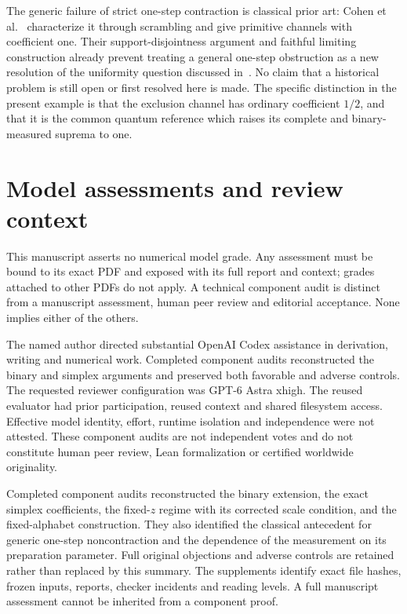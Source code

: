 \documentclass[11pt]{article}
\theoremstyle{remark}\newtheorem{remark}[theorem]{Remark}
\begin{document}
The generic failure of strict one-step contraction is classical prior art: Cohen et al.~\cite[Theorem 4.2 and Remark 4.3]{Cohen} characterize it through scrambling and give primitive channels with coefficient one. Their support-disjointness argument and faithful limiting construction already prevent treating a general one-step obstruction as a new resolution of the uniformity question discussed in~\cite{GR}. No claim that a historical problem is still open or first resolved here is made. The specific distinction in the present example is that the exclusion channel has ordinary coefficient $1/2$, and that it is the common quantum reference which raises its complete and binary-measured suprema to one.

\clearpage
\appendix
\section{Model assessments and review context}
This manuscript asserts no numerical model grade. Any assessment must be bound to its exact PDF and exposed with its full report and context; grades attached to other PDFs do not apply. A technical component audit is distinct from a manuscript assessment, human peer review and editorial acceptance. None implies either of the others.

The named author directed substantial OpenAI Codex assistance in derivation, writing and numerical work. Completed component audits reconstructed the binary and simplex arguments and preserved both favorable and adverse controls. The requested reviewer configuration was GPT-6 Astra xhigh. The reused evaluator had prior participation, reused context and shared filesystem access. Effective model identity, effort, runtime isolation and independence were not attested. These component audits are not independent votes and do not constitute human peer review, Lean formalization or certified worldwide originality.

Completed component audits reconstructed the binary extension, the exact simplex coefficients, the fixed-$z$ regime with its corrected scale condition, and the fixed-alphabet construction. They also identified the classical antecedent for generic one-step noncontraction and the dependence of the measurement on its preparation parameter. Full original objections and adverse controls are retained rather than replaced by this summary. The supplements identify exact file hashes, frozen inputs, reports, checker incidents and reading levels. A full manuscript assessment cannot be inherited from a component proof.
\end{document}
